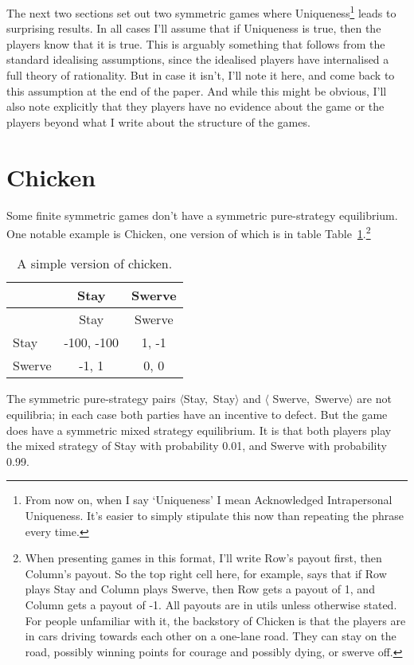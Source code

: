 \documentclass[
  10pt,
  letterpaper,
  DIV=11,
  numbers=noendperiod,
  twoside]{scrartcl}
\begin{document}
The next two sections set out two symmetric games where
Uniqueness\footnote{From now on, when I say `Uniqueness' I mean
  Acknowledged Intrapersonal Uniqueness. It's easier to simply stipulate
  this now than repeating the phrase every time.} leads to surprising
results. In all cases I'll assume that if Uniqueness is true, then the
players know that it is true. This is arguably something that follows
from the standard idealising assumptions, since the idealised players
have internalised a full theory of rationality. But in case it isn't,
I'll note it here, and come back to this assumption at the end of the
paper. And while this might be obvious, I'll also note explicitly that
they players have no evidence about the game or the players beyond what
I write about the structure of the games.

\section{Chicken}\label{chicken}

Some finite symmetric games don't have a symmetric pure-strategy
equilibrium. One notable example is Chicken, one version of which is in
table Table~\ref{tbl-chicken}.\footnote{When presenting games in this
  format, I'll write Row's payout first, then Column's payout. So the
  top right cell here, for example, says that if Row plays Stay and
  Column plays Swerve, then Row gets a payout of 1, and Column gets a
  payout of -1. All payouts are in utils unless otherwise stated. For
  people unfamiliar with it, the backstory of Chicken is that the
  players are in cars driving towards each other on a one-lane road.
  They can stay on the road, possibly winning points for courage and
  possibly dying, or swerve off.}

\begin{longtable}[]{@{}lcc@{}}
\caption{A simple version of chicken.}\label{tbl-chicken}\tabularnewline
\toprule\noalign{}
& Stay & Swerve \\
\midrule\noalign{}
\endfirsthead
\toprule\noalign{}
& Stay & Swerve \\
\midrule\noalign{}
\endhead
\bottomrule\noalign{}
\endlastfoot
Stay & -100, -100 & 1, -1 \\
Swerve & -1, 1 & 0, 0 \\
\end{longtable}

The symmetric pure-strategy pairs \(\langle\)Stay,~Stay\(\rangle\) and
\(\langle\) Swerve,~Swerve\(\rangle\) are not equilibria; in each case
both parties have an incentive to defect. But the game does have a
symmetric mixed strategy equilibrium. It is that both players play the
mixed strategy of Stay with probability 0.01, and Swerve with
probability 0.99.
\end{document}
